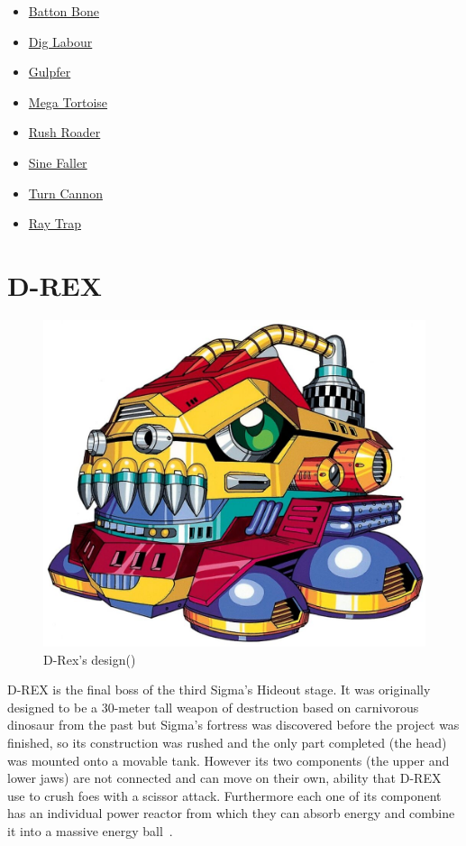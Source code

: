 \begin{itemize}
	\item \hyperlink{enem:Batton_Bone}{Batton Bone}
	\item \hyperlink{enem:Dig_Labour}{Dig Labour}
	\item \hyperlink{enem:Gulpfer}{Gulpfer}
	\item \hyperlink{enem:Mega_Tortoise}{Mega Tortoise}
	\item \hyperlink{enem:Rush_Roader}{Rush Roader}
	\item \hyperlink{enem:Sine_Faller}{Sine Faller}
	\item \hyperlink{enem:Turn_Cannon}{Turn Cannon}
	\item \hyperlink{enem:Ray_Trap}{Ray Trap}
\end{itemize} 

\section{D-REX}
\begin{figure}[htp]
	\centering
	\includegraphics[width=0.4\linewidth]{figures/X1/Sigma_stages/Drex.jpg}
	\caption{D-Rex's design(\cite{book:MMX_Complete_art})}
\end{figure}

D-REX is the final boss of the third Sigma's Hideout stage. It was originally designed to be a 30-meter tall weapon of destruction based on carnivorous dinosaur from the past but Sigma's fortress was discovered before the project was finished, so its construction was rushed and the only part completed (the head) was mounted onto a movable tank. However its two components (the upper and lower jaws) are not connected and can move on their own, ability that D-REX use to crush foes with a scissor attack. Furthermore each one of its component has an individual power reactor from which they can absorb energy and combine it into a massive energy ball~\cite{wayback:X_resources}.

